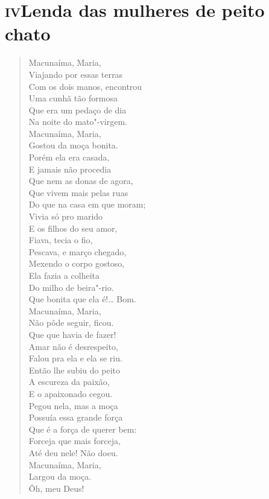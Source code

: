 \chapter[Lenda das mulheres de peito chato]{\textsc{iv}\break Lenda das mulheres de peito chato}

\begin{verse}
Macunaíma, Maria,\\
Viajando por essas terras\\
Com os dois manos, encontrou\\
Uma cunhã tão formosa\\
Que era um pedaço de dia\\
Na noite do mato"-virgem.\\
Macunaíma, Maria,\\
Gostou da moça bonita.\\
Porém ela era casada,\\
E jamais não procedia\\
Que nem as donas de agora,\\
Que vivem mais pelas ruas\\
Do que na casa em que moram;\\
Vivia só pro marido\\
E os filhos do seu amor,\\
Fiava, tecia o fio,\\
Pescava, e março chegado,\\
Mexendo o corpo gostoso,\\
Ela fazia a colheita\\
Do milho de beira"-rio.\\
Que bonita que ela é!\ldots{} Bom.\\
Macunaíma, Maria,\\
Não pôde seguir, ficou.\\
Que que havia de fazer!\\
Amar não é desrespeito,\\
Falou pra ela e ela se riu.\\
Então lhe subiu do peito\\
A escureza da paixão,\\
E o apaixonado cegou.\\
Pegou nela, mas a moça\\
Possuía essa grande força\\
Que é a força de querer bem:\\
Forceja que mais forceja,\\
Até deu nele! Não doeu.\\
Macunaíma, Maria,\\
Largou da moça.\\
\qquad\qquad\qquad{}Ôh, meu Deus!


\end{verse}
